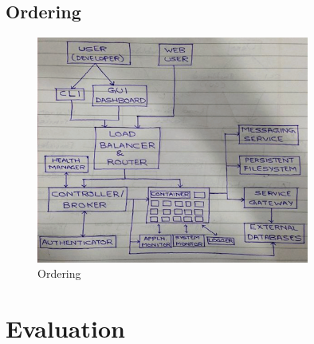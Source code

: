 \documentclass[a4paper]{article}
\begin{document}
  \subsection{Ordering}
  \begin{figure}[H]
  \centering
  \includegraphics[width=0.8\textwidth]{flow.png}
  \caption{\label{ordering}Ordering}
  \end{figure}  

  \section{Evaluation}
  
\end{document}
